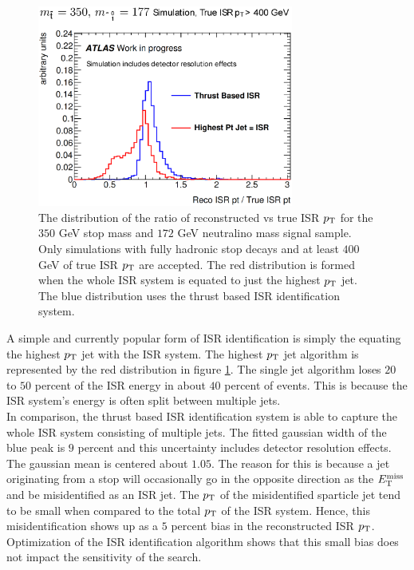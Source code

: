 \begin{figure}[h]
\centering
\includegraphics[width=0.75\textwidth]{./figures/strategy/ThrustAlgoEfficiency.eps}
\caption{The distribution of the ratio of reconstructed vs true ISR $p_{\mathrm{T}}$ for the $350$ GeV stop mass and $172$ GeV neutralino mass signal sample.  Only simulations with fully hadronic stop decays and at least $400$ GeV of true ISR $p_{\mathrm{T}}$ are accepted.  The red distribution is formed when the whole ISR system is equated to just the highest $p_{\mathrm{T}}$ jet.  The blue distribution uses the thrust based ISR identification system.  \label{fig:ISRPerformance}}
\end{figure}

\indent A simple and currently popular form of ISR identification is simply the equating the highest $p_{\mathrm{T}}$ jet with the ISR system. The highest $p_{\mathrm{T}}$ jet algorithm is represented by the red distribution in figure \ref{fig:ISRPerformance}. The single jet algorithm loses $20$ to $50$ percent of the ISR energy in about $40$ percent of events.  This is because the ISR system's energy is often split between multiple jets. \\

\indent In comparison, the thrust based ISR identification system is able to capture the whole ISR system consisting of multiple jets.  The fitted gaussian width of the blue peak is $9$ percent and this uncertainty includes detector resolution effects.  The gaussian mean is centered about $1.05$.  The reason for this is because a jet originating from a stop will occasionally go in the opposite direction as the $E_{\mathrm{T}}^{\mathrm{miss}}$ and be misidentified as an ISR jet.  The $p_{\mathrm{T}}$ of the misidentified sparticle jet tend to be small when compared to the total $p_{\mathrm{T}}$ of the ISR system.  Hence, this misidentification shows up as a $5$ percent bias in the reconstructed ISR $p_{\mathrm{T}}$.  Optimization of the ISR identification algorithm shows that this small bias does not impact the sensitivity of the search.  \\

